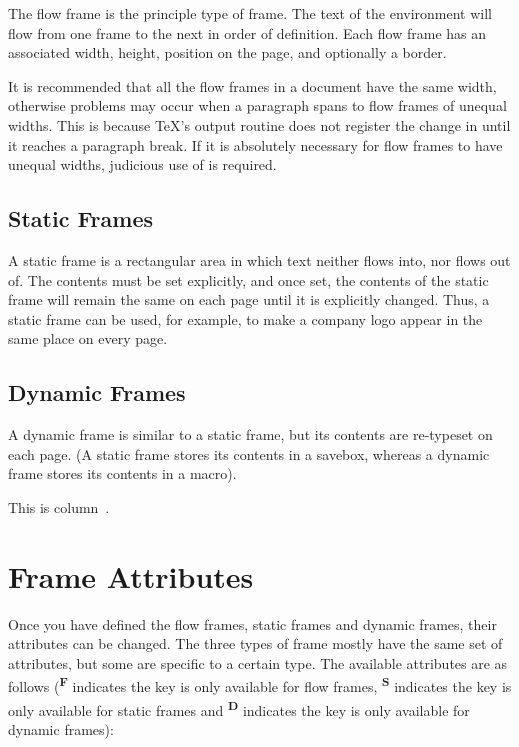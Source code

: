 \documentclass{article}
\begin{document}
The flow frame is the principle type of frame.
The text of the  environment will flow from
one frame to the next in order of definition. Each
flow frame has an associated width, height,
position on the page, and optionally a border.

It is recommended that all the flow frames in a document
have the same width, otherwise problems may occur
when a paragraph spans to flow frames of unequal
widths. This is because \TeX's output routine does not
register the change in  until it reaches
a paragraph break. If it is absolutely necessary for
flow frames to have unequal widths, judicious use of
 is required.

\section*{Static Frames}

A static frame is a rectangular area in which text neither
flows into, nor flows out of.  The contents must be set
explicitly, and once set, the contents of the static frame will
remain the same on each page until it is explicitly
changed.  Thus, a static frame can be used, for example, to make
a company logo appear in the same place on every page.

\section*{Dynamic Frames}

A dynamic frame is similar to a static frame, but its contents
are re-typeset on each page. (A static frame stores its
contents in a savebox, whereas a dynamic frame stores its
contents in a macro).

This is column~\thedisplayedframe.

\chapter{Frame Attributes}
\label{sec:modattr}

Once you have defined the {flow frames}, {static frames} and
{dynamic frames}, their attributes can be changed.
The three types of frame mostly have the
same set of attributes, but some are specific to a certain type.
The available attributes are as follows
(\textsuperscript{\textbf{F}} indicates the key is
only available for {flow frames},
\textsuperscript{\textbf{S}} indicates the key is only available
for {static frames}
and \textsuperscript{\textbf{D}} indicates the key
is only available for {dynamic frames}):
\end{document}
